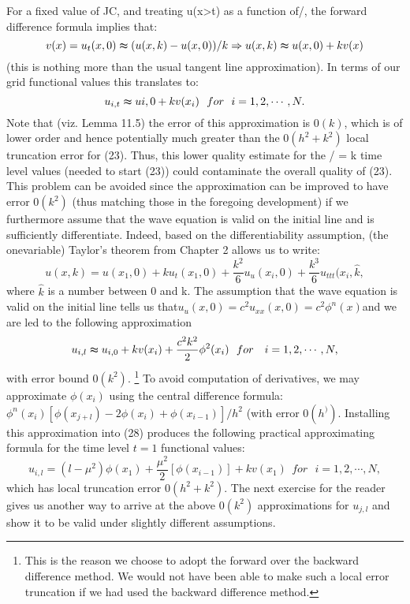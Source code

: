 \documentclass[../main.tex]{subfiles}
\begin{document}
For a fixed value of JC, and treating u(x>t) as a function of/, the forward difference 
formula implies that:
$$v(x)=u_t(x,0)\thickapprox (u(x,k)-u(x,0))/k\Rightarrow u(x,k) \thickapprox u(x,0)+kv(x)$$
(this is nothing more than the usual tangent line approximation). In terms of our 
grid functional values this translates to: 
\begin{equation}\label{eqa27}
	u_{i,t} \thickapprox u{i,0}+kv(x_i) ~~for~~i=1,2,\cdots,N.
\end{equation}
Note that (viz. Lemma 11.5) the error of this approximation is $0(k)$, which is of lower order and hence potentially much greater than the $0(h^2+k^2)$ local truncation error for (23). Thus, this lower quality estimate for the / = k time level values (needed to start (23)) could contaminate the overall quality of (23). This problem can be avoided since the approximation can be improved to have error $0(k^2)$ (thus matching those in the foregoing development) if we furthermore assume that the wave equation is valid on the initial line and is sufficiently differentiate. Indeed, based on the differentiability assumption, (the onevariable) Taylor's theorem from Chapter 2 allows us to write: 
$$
u(x,k)=u(x_1,0)+ku_t(x_1,0)+\dfrac{k^2}{6}u_u(x_i,0)+\dfrac{k^3}{6} u_{ttt}(x_i, \hat{k},
$$
where $\hat{k}$ is a number between 0 and k. The assumption that the wave equation is 
valid on the initial line tells us that$ u_u(x,0)=c^2u_{xx}(x,0)=c^2\phi^n(x) $and we are led to the following approximation
\begin{equation}\label{eqa28}
	u_{i,l}\thickapprox u_{i,0}+kv(x_i)+\dfrac{c^2k^2}{2}\phi^2(x_i) ~~for ~~~i=1,2,\cdots,N,
\end{equation}
with error bound $0(k^2)$.
\footnote{This is the reason we choose to adopt the forward over the backward difference method. We would 
not have been able to make such a local error truncation if we had used the backward difference 
method.}
To avoid computation of derivatives, we may approximate 
$\phi(x_i)$ using the central difference formula: 
$\phi^n(x_i)[\phi (x_{j+l} ) -2\phi(x_i)+\phi(x_{i-1})]/h^2$
(with error $0(h^))$. Installing this approximation into (28) produces the following practical approximating formula for the time level $t = 1$ functional values: 
\begin{equation}\label{eqa29}
	u_{i,l}=(l-\mu^2)\phi(x_1)+\dfrac{\mu^2}{2}[\phi(x_{i-1})]+kv(x_1)
	 ~~for ~~~i=1,2,\cdots,N,
\end{equation}
which has local truncation error $0(h^2+k^2)$. The next exercise for the reader gives us another way to arrive at the above $0(k^2)$ approximations for $u_{j,l}$ and show it to be valid under slightly different assumptions. 
\end{document}

